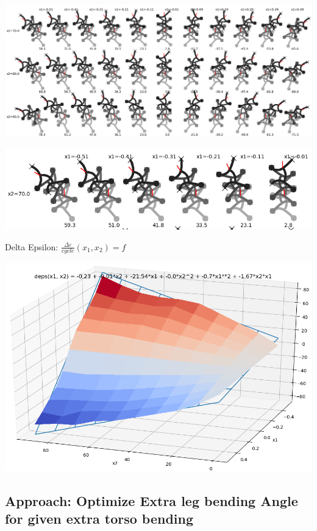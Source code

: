\documentclass[10pt,a4paper]{article}
\begin{document}
\includegraphics[width=.95\textwidth]{pics/model_2/GeckoBotGait_2cyc.png}

\includegraphics[width=.95\textwidth]{pics/model_2/GeckoBotGait_2cyc_zoom.png}

Delta Epsilon: $\frac{\Delta \varepsilon}{cycle} (x_1, x_2) = f$

\includegraphics[width=.95\textwidth]{pics/model_2/Delta_Epsilon_2cyc.png}



\subsection{Approach: Optimize Extra leg bending Angle for given extra torso bending}
\end{document}
